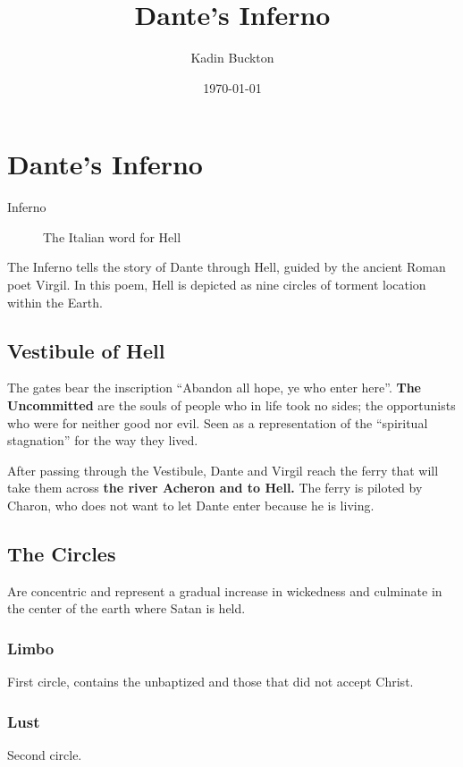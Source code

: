 \documentclass[11pt]{article}
\author{Kadin Buckton}
\date{\today}
\title{Dante's Inferno}
\begin{document}
\maketitle

\section*{Dante's Inferno}
\label{sec:org93b2f3d}
\begin{description}
\item[{Inferno}] The Italian word for Hell
\end{description}

The Inferno tells the story of Dante through Hell, guided by the ancient Roman poet Virgil. In this poem, Hell is depicted as nine circles of torment location within the Earth.

\subsection*{Vestibule of Hell}
\label{sec:org97143c2}
The gates bear the inscription ``Abandon all hope, ye who enter here''. \textbf{The Uncommitted} are the souls of people who in life took no sides; the opportunists who were for neither good nor evil. Seen as a representation of the ``spiritual stagnation'' for the way they lived.

After passing through the Vestibule, Dante and Virgil reach the ferry that will take them across \textbf{the river Acheron and to Hell.} The ferry is piloted by Charon, who does not want to let Dante enter because he is living.

\subsection*{The Circles}
\label{sec:orgdc1fd05}
Are concentric and represent a gradual increase in wickedness and culminate in the center of the earth where Satan is held.

\subsubsection*{Limbo}
\label{sec:org6e71c21}
First circle, contains the unbaptized and those that did not accept Christ.

\subsubsection*{Lust}
\label{sec:orgfccac31}
Second circle. 
\end{document}
